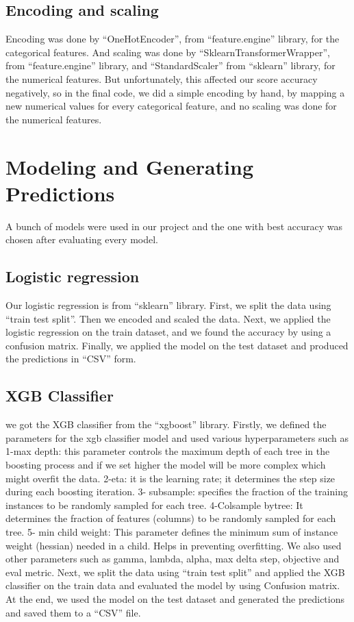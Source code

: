 \documentclass{article}
\begin{document}
\subsection{Encoding and scaling}
Encoding was done by “OneHotEncoder”, from “feature.engine” library, for the categorical features. And scaling was done by “SklearnTransformerWrapper”, from “feature.engine” library, and “StandardScaler” from “sklearn” library, for the numerical features. But unfortunately, this affected our score accuracy negatively, so in the final code, we did a simple encoding by hand, by mapping a new numerical values for every categorical feature, and no scaling was done for the numerical features.

\section{Modeling and Generating Predictions}
A bunch of models were used in our project and the one with best accuracy was chosen after evaluating every model.

\subsection{Logistic regression}
Our logistic regression is from “sklearn” library. First, we split the data using “train test split”. Then we encoded and scaled the data. Next, we applied the logistic regression on the train dataset, and we found the accuracy by using a confusion matrix. Finally, we applied the model on the test dataset and produced the predictions in “CSV” form.

\subsection{XGB Classifier}
we got the XGB classifier from the “xgboost” library. Firstly, we defined the parameters for the xgb classifier model and used various hyperparameters such as
1-max depth: this parameter controls the maximum depth of each tree in the boosting process and if we set higher the model will be more complex which might overfit the data.
2-eta: it is the learning rate; it determines the step size during each boosting iteration.
3- subsample: specifies the fraction of the training
instances to be randomly sampled for each tree.
4-Colsample bytree: It determines the fraction of features (columns) to be randomly sampled for each tree.
5- min child weight: This parameter defines the minimum sum of instance weight (hessian) needed in a child. Helps in preventing overfitting.
We also used other parameters such as gamma, lambda, alpha, max delta step, objective and eval metric. Next, we split the data using “train test split” and applied the XGB classifier on the train data and evaluated the model by using Confusion matrix. At the end, we used the model on the test dataset and generated the predictions and saved them to a “CSV” file.
\end{document}

